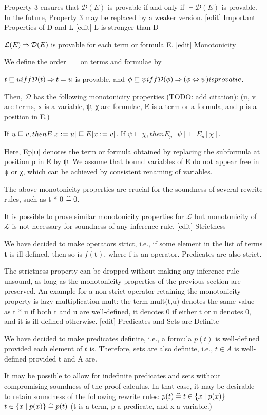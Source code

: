 Property 3 ensures that $\mathcal{D}(E)$ is provable if and only if $\vdash\mathcal{D}(E)$ is provable. In the future, Property 3 may be replaced by a weaker version.
[edit] Important Properties of D and L
[edit] L is stronger than D

$\mathcal{L}(E) \mathbin\Rightarrow \mathcal{D}(E)$ is provable for each term or formula E.
[edit] Monotonicity

We define the order $\sqsubseteq$ on terms and formulae by

    $t \sqsubseteq u iff \mathcal{D}(t)\mathbin\Rightarrow t=u$ is provable, and
   $ \phi\sqsubseteq\psi iff \mathcal{D}(\phi)\mathbin\Rightarrow (\phi\mathbin\Leftrightarrow\psi) is provable$. 

Then, $\mathcal{D}$ has the following monotonicity properties (TODO: add citation):
(u, v are terms, x is a variable, ψ, χ are formulae, E is a term or a formula, and p is a position in E.)

    If $u \sqsubseteq v, then E[x\mathrel{:\mkern1mu=} u] \sqsubseteq E[x\mathrel{:\mkern1mu=} v]$.
    If $\psi \sqsubseteq \chi, then E_p[\psi] \sqsubseteq E_p[\chi]$.

Here, Ep[ψ] denotes the term or formula obtained by replacing the subformula at position p in E by ψ. We assume that bound variables of E do not appear free in ψ or χ, which can be achieved by consistent renaming of variables.

The above monotonicity properties are crucial for the soundness of several rewrite rules, such as t * 0 $\mathrel{\widehat=} 0$.

It is possible to prove similar monotonicity properties for $\mathcal{L}$ but monotonicity of $\mathcal{L}$ is not necessary for soundness of any inference rule.
[edit] Strictness

We have decided to make operators strict, i.e., if some element in the list of terms $\mathbf{t}$ is ill-defined, then so is $f(\mathbf{t})$, where f is an operator. Predicates are also strict.

The strictness property can be dropped without making any inference rule unsound, as long as the monotonicity properties of the previous section are preserved. An example for a non-strict operator retaining the monotonicity property is lazy multiplication mult: the term mult(t,u) denotes the same value as t * u if both t and u are well-defined, it denotes 0 if either t or u denotes 0, and it is ill-defined otherwise.
[edit] Predicates and Sets are Definite

We have decided to make predicates definite, i.e., a formula $p(t)$ is well-defined provided each element of $t$ is. Therefore, sets are also definite, i.e., $t \in A$ is well-defined provided t and A are.

It may be possible to allow for indefinite predicates and sets without compromising soundness of the proof calculus. In that case, it may be desirable to retain soundness of the following rewrite rules:
$p(t) \mathrel{\widehat=} t \in \{x\mid p(x)\}$
$t\in\{x\mid p(x)\} \mathrel{\widehat=} p(t)$
(t is a term, p a predicate, and x a variable.) 


